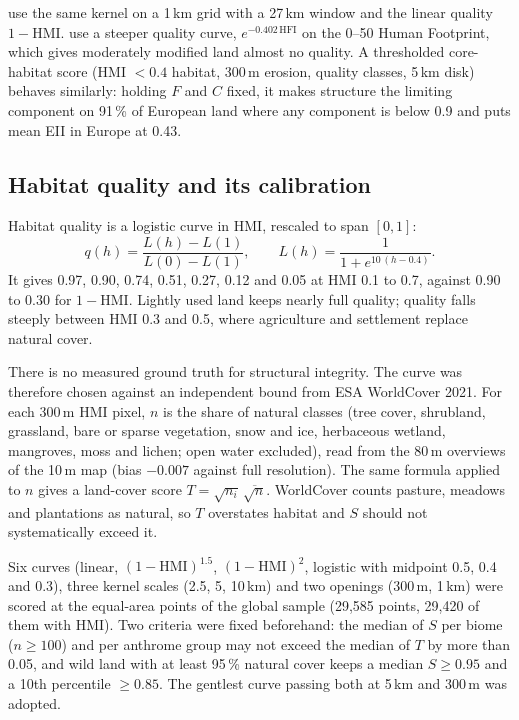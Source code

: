 \documentclass[11pt,a4paper]{article}
\newcommand{\HMI}{\mathrm{HMI}}
\begin{document}
\citet{hill2026} use the same kernel on a 1\,km grid with a 27\,km window and the linear quality
$1 - \HMI$. \citet{beyer2020} use a steeper quality curve, $e^{-0.402\,\mathrm{HFI}}$ on the 0--50
Human Footprint, which gives moderately modified land almost no quality. A thresholded
core-habitat score (HMI $< 0.4$ habitat, 300\,m erosion, quality classes, 5\,km disk) behaves
similarly: holding $F$ and $C$ fixed, it makes structure the limiting component on 91\,\% of
European land where any component is below 0.9 and puts mean EII in Europe at 0.43.

\subsection{Habitat quality and its calibration}
\label{sec:quality}

Habitat quality is a logistic curve in HMI, rescaled to span $[0, 1]$:
\begin{equation}
q(h) = \frac{L(h) - L(1)}{L(0) - L(1)}, \qquad L(h) = \frac{1}{1 + e^{10\,(h - 0.4)}}.
\end{equation}
It gives 0.97, 0.90, 0.74, 0.51, 0.27, 0.12 and 0.05 at HMI 0.1 to 0.7, against 0.90 to 0.30 for
$1 - \HMI$. Lightly used land keeps nearly full quality; quality falls steeply between HMI 0.3 and
0.5, where agriculture and settlement replace natural cover.

There is no measured ground truth for structural integrity. The curve was therefore chosen
against an independent bound from ESA WorldCover 2021. For each 300\,m HMI pixel, $n$ is the share
of natural classes (tree cover, shrubland, grassland, bare or sparse vegetation, snow and ice,
herbaceous wetland, mangroves, moss and lichen; open water excluded), read from the 80\,m
overviews of the 10\,m map (bias $-0.007$ against full resolution). The same formula applied to
$n$ gives a land-cover score $T = \sqrt{n_i}\,\overline{\sqrt{n}}$. WorldCover counts pasture,
meadows and plantations as natural, so $T$ overstates habitat and $S$ should not systematically
exceed it.

Six curves (linear, $(1-\HMI)^{1.5}$, $(1-\HMI)^2$, logistic with midpoint 0.5, 0.4 and 0.3), three
kernel scales (2.5, 5, 10\,km) and two openings (300\,m, 1\,km) were scored at the equal-area
points of the global sample (29,585 points, 29,420 of them with HMI). Two criteria were fixed beforehand: the median of $S$ per
biome ($n \ge 100$) and per anthrome group may not exceed the median of $T$ by more than 0.05,
and wild land with at least 95\,\% natural cover keeps a median $S \ge 0.95$ and a 10th percentile
$\ge 0.85$. The gentlest curve passing both at 5\,km and 300\,m was adopted.
\end{document}

